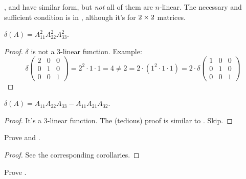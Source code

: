 \begin{note}
,  and  have similar form, but \emph{not} all of them are \(n\)-linear.
The necessary and sufficient condition is in , although it's for \(2\times2\) matrices.
\end{note}

\begin{exercise} \label{exercise 4.5.9}
\(\delta(A)= A^2_{11} A^2_{22} A^2_{33}\).
\end{exercise}

\begin{proof}
\(\delta\) is not a \(3\)-linear function. Example:
\[
    \delta\begin{pmatrix}
        2 & 0 & 0 \\
        0 & 1 & 0 \\
        0 & 0 & 1
    \end{pmatrix}
    = 2^2 \cdot 1 \cdot 1 = 4 \neq 2 = 2 \cdot (1^2 \cdot 1 \cdot 1)
    = 2 \cdot \delta \begin{pmatrix}
        1 & 0 & 0 \\
        0 & 1 & 0 \\
        0 & 0 & 1
    \end{pmatrix}
\]
\end{proof}

\begin{exercise} \label{exercise 4.5.10}
\(\delta(A) = A_{11}A_{22}A_{33} - A_{11}A_{21}A_{32}\).
\end{exercise}

\begin{proof}
It's a \(3\)-linear function. The (tedious) proof is similar to . Skip.
\end{proof}

\begin{exercise} \label{exercise 4.5.11}
Prove  and .
\end{exercise}

\begin{proof}
See the corresponding corollaries.
\end{proof}

\begin{exercise} \label{exercise 4.5.12}
Prove .
\end{exercise}

